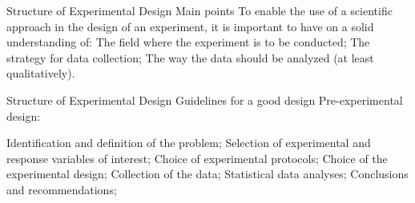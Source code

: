 \documentclass[t]{beamer}
\begin{document}


\begin{ftst}
{Structure of Experimental Design}
{Main points}
To enable the use of a scientific approach in the design of an experiment, it is important to have on a solid understanding of:
\vhalf
\bitems The field where the experiment is to be conducted;
	\spitem The strategy for data collection;
	\spitem The way the data should be analyzed (at least qualitatively).
\eitem
\end{ftst}


\begin{ftst}
{Structure of Experimental Design}
{Guidelines for a good design}
\bitems Pre-experimental design:

	\bitems Identification and definition of the problem;
		\spitem Selection of experimental and response variables of interest;
		\spitem Choice of experimental protocols;
	\eitem
	\spitem Choice of the experimental design;
	\spitem Collection of the data;
	\spitem Statistical data analyses;
	\spitem Conclusions and recommendations;
\eitem
\end{ftst}
\end{document}

